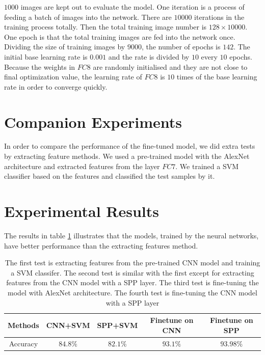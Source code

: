 $1000$ images are kept out to evaluate the model. One iteration is a process of feeding a batch of images into the network. There are $10000$ iterations in the training process totally. Then the total training image number is $128\times10000$. One epoch is that the total training images are fed into the network once. Dividing the size of training images by $9000$, the number of epochs is $142$. The initial base learning rate is $0.001$ and the rate is divided by $10$ every $10$ epochs. Because the weights in $FC8$ are randomly initialised and they are not close to final optimization value, the learning rate of $FC8$ is $10$ times of the base learning rate in order to converge quickly.

\section{Companion Experiments}

In order to compare the performance of the fine-tuned model, we did extra tests by extracting feature methods. We used a pre-trained model with the AlexNet architecture and extracted features from the layer $FC7$. We trained a SVM classifier based on the features and classified the test samples by it.

\section{Experimental Results}

The results in table \ref{ExpRes} illustrates that the models, trained by the neural networks, have better performance than the extracting features method. 

\begin{table}[h]
\begin{center}
    \begin{tabular}{| c | c | c | c | c |}
    \hline
    Methods & CNN+SVM & SPP+SVM & Finetune on CNN & Finetune on SPP  \\ \hline
    Accuracy & $84.8\%$ & $82.1\%$ & $93.1\%$ & $93.98\%$ \\ \hline
    \end{tabular}
    \caption{The first test is extracting features from the pre-trained CNN model and training a SVM classifer. The second test is similar with the first except for extracting features from the CNN model with a SPP layer. The third test is fine-tuning the model with AlexNet architecture. The fourth test is fine-tuning the CNN model with a SPP layer}
    \label{ExpRes}
\end{center}
\end{table}

